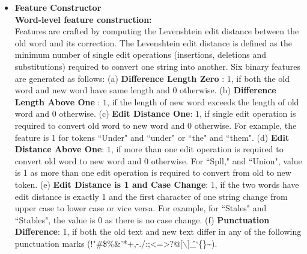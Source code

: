 \documentclass{sig-alternate}
\begin{document}
\begin{enumerate}
\begin{itemize}
\item \textbf{Feature Constructor }\\ 
\textbf{Word-level feature construction:}\\
Features are crafted by computing the Levenshtein edit distance between the old word and its correction. The Levenshtein edit distance \cite{Wagner_74} is defined as the minimum number of single edit operations (insertions, deletions and substitutions) required to convert one string into another. Six binary features are generated as follows: 
(a) \textbf{Difference Length Zero} : $1$, if both the old word and new word have same length and $0$ otherwise. 
(b) \textbf{Difference Length Above One} : $1$, if the length of new word exceeds the length of old word and $0$ otherwise.
(c) \textbf{Edit Distance One}:  $1$, if single edit operation is required to convert old word to new word and $0$ otherwise. For example, the feature is 1 for tokens ``Under" and ``under" or ``the" and ``them".
(d) \textbf{Edit Distance Above One}: $1$, if more than one edit operation is required to convert old word to new word and $0$ otherwise. For ``Spll," and ``Union", value is 1 as more than one edit operation is required to convert from old to new token.
(e) \textbf{Edit Distance is 1 and Case Change}: 1, if the two words have edit distance is exactly 1 and the first character of one string change from upper case to lower case or vice versa. For example, for ``Stales" and ``Stables", the value is 0 as there is no case change.
(f) \textbf{Punctuation Difference}: 1, if both the old text and new text differ in any of the following punctuation marks (!"\#\$\%\&'*+,-./:;\textless=\textgreater?@[$\backslash$]\^\_`\{\textbar\}\textasciitilde).


\end{itemize}
\end{enumerate}
\end{document}
